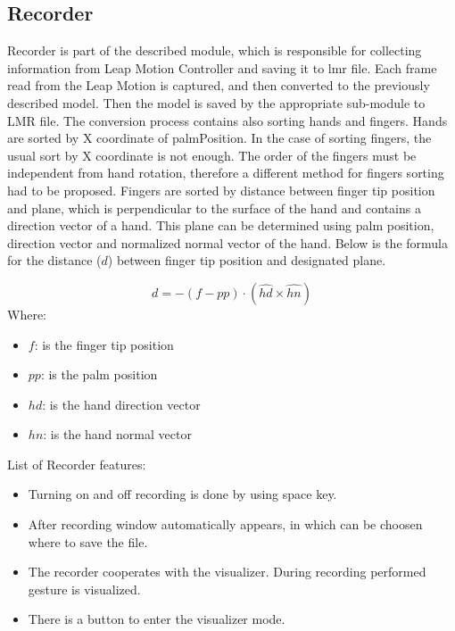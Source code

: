 \subsection{Recorder}
Recorder is part of the described module, which is responsible for collecting information from Leap Motion Controller and saving it to lmr file.
Each frame read from the Leap Motion is captured, and then converted to the previously described model. Then the model is saved by the appropriate sub-module to LMR file. The conversion process contains also sorting hands and fingers. Hands are sorted by X coordinate of palmPosition. In the case of sorting fingers, the usual sort by X coordinate is not enough. The order of the fingers must be independent from hand rotation, therefore a different method for fingers sorting had to be proposed. Fingers are sorted by distance between finger tip position and plane, which is perpendicular to the surface of the hand and contains a direction vector of a hand. This plane can be determined using palm position, direction vector and normalized normal vector of the hand.
Below is the formula for the distance ($d$) between finger tip position and designated plane.

\[ d = -(f - pp) \cdot (\hat{hd} \times \hat{hn}) \]
Where:
\begin{itemize}
    \item[] $f$: is the finger tip position
    \item[] $pp$: is the palm position
    \item[] $hd$: is the hand direction vector
    \item[] $hn$: is the hand normal vector
\end{itemize}

List of Recorder features:
\begin{itemize}
\item Turning on and off recording is done by using space key.
\item After recording window automatically appears, in which can be choosen where to save the file.
\item The recorder cooperates with the visualizer. During recording performed gesture is visualized.
\item There is a button to enter the visualizer mode.
\end{itemize}

